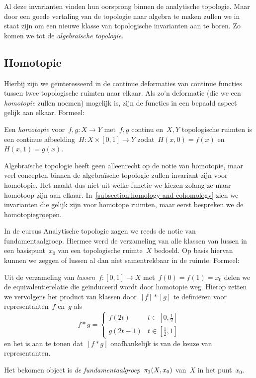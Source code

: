 \documentclass[a4paper,11pt,openany,oneside,article]{memoir}
\begin{document}
Al deze invarianten vinden hun oorsprong binnen de analytische topologie. Maar door een goede vertaling van de topologie naar algebra te maken zullen we in staat zijn om een nieuwe klasse van topologische invarianten aan te boren. Zo komen we tot de \emph{algebra\"ische topologie}.

\subsection{Homotopie}
Hierbij zijn we ge\"interesseerd in de continue deformaties van continue functies tussen twee topologische ruimten naar elkaar. Als zo'n deformatie (die we een \emph{homotopie} zullen noemen) mogelijk is, zijn de functies in een bepaald aspect gelijk aan elkaar. Formeel:

\begin{definition}
  Een \emph{homotopie} voor~$f,g\colon X\to Y$ met~$f,g$ continu en~$X,Y$ topologische ruimten is een continue afbeelding~$H\colon X\times[0,1]\to Y$ zodat~$H(x,0)=f(x)$ en~$H(x,1)=g(x)$.
\end{definition}

Algebra\"ische topologie heeft geen alleenrecht op de notie van homotopie, maar veel concepten binnen de algebra\"ische topologie zullen invariant zijn voor homotopie. Het maakt dus niet uit welke functie we kiezen zolang ze maar homotoop zijn aan elkaar. In~\cref{subsection:homology-and-cohomology} zien we invarianten die gelijk zijn voor homotope ruimten, maar eerst bespreken we de homotopiegroepen.

In de cursus Analytische topologie zagen we reeds de notie van fundamentaalgroep. Hiermee werd de verzameling van alle klassen van lussen in een basispunt~$x_0$ van een topologische ruimte~$X$ bedoeld. Op basis hiervan kunnen we zeggen of lussen al dan niet samentrekbaar in de ruimte. Formeel:

\begin{definition}
  Uit de verzameling van \emph{lussen}~$f\colon[0,1]\to X$ met~$f(0)=f(1)=x_0$ delen we de equivalentierelatie die ge\"induceerd wordt door homotopie weg. Hierop zetten we vervolgens het product van klassen door~$[f]\ast [g]$ te defini\"eren voor representanten~$f$ en~$g$ als
  \begin{equation}
    f\ast g=
      \begin{cases}
        f(2t) & t\in\left[0,\frac{1}{2}\right] \\
        g(2t-1) & t\in\left[\frac{1}{2},1\right]
      \end{cases}
  \end{equation}
  en het is aan te tonen dat~$[f\ast g]$ onafhankelijk is van de keuze van representanten.

  Het bekomen object is \emph{de fundamentaalgroep~$\pi_1(X,x_0)$} van~$X$ in het punt~$x_0$.
\end{definition}
\end{document}
